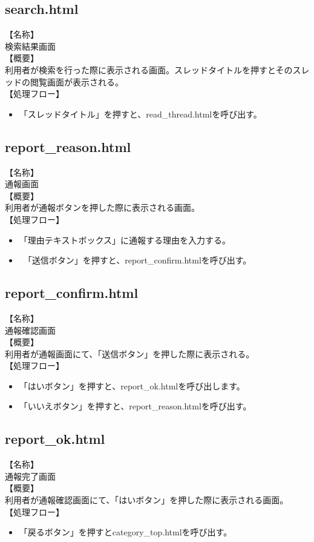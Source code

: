 \documentclass[a4j]{jarticle}
\begin{document}
\subsection{search.html}
【名称】
\\検索結果画面
\\【概要】
\\利用者が検索を行った際に表示される画面。スレッドタイトルを押すとそのスレッドの閲覧画面が表示される。
\\【処理フロー】
\\\begin{itemize}
\item 「スレッドタイトル」を押すと、read\_thread.htmlを呼び出す。
\end{itemize}

\subsection{report\_reason.html}
【名称】
\\通報画面
\\【概要】
\\利用者が通報ボタンを押した際に表示される画面。
\\【処理フロー】
\\\begin{itemize}
\item 「理由テキストボックス」に通報する理由を入力する。
\item　「送信ボタン」を押すと、report\_confirm.htmlを呼び出す。
\end{itemize}
\subsection{report\_confirm.html}
【名称】
\\通報確認画面
\\【概要】
\\利用者が通報画面にて、「送信ボタン」を押した際に表示される。
\\【処理フロー】
\\\begin{itemize}
\item 「はいボタン」を押すと、report\_ok.htmlを呼び出します。
\item 「いいえボタン」を押すと、report\_reason.htmlを呼び出す。
\\\end{itemize}
\subsection{report\_ok.html}
【名称】
\\通報完了画面
\\【概要】
\\利用者が通報確認画面にて、「はいボタン」を押した際に表示される画面。
\\【処理フロー】
\\\begin{itemize}
  \item 「戻るボタン」を押すとcategory\_top.htmlを呼び出す。
\end{itemize}
\end{document}
